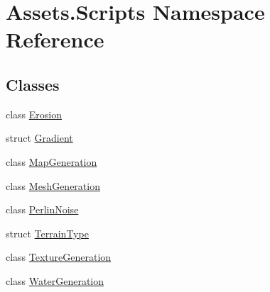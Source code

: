 \hypertarget{namespace_assets_1_1_scripts}{}\section{Assets.\+Scripts Namespace Reference}
\label{namespace_assets_1_1_scripts}
\subsection*{Classes}
\begin{DoxyCompactItemize}
\item 
class \mbox{\hyperlink{class_assets_1_1_scripts_1_1_erosion}{Erosion}}
\item 
struct \mbox{\hyperlink{struct_assets_1_1_scripts_1_1_gradient}{Gradient}}
\item 
class \mbox{\hyperlink{class_assets_1_1_scripts_1_1_map_generation}{Map\+Generation}}
\item 
class \mbox{\hyperlink{class_assets_1_1_scripts_1_1_mesh_generation}{Mesh\+Generation}}
\item 
class \mbox{\hyperlink{class_assets_1_1_scripts_1_1_perlin_noise}{Perlin\+Noise}}
\item 
struct \mbox{\hyperlink{struct_assets_1_1_scripts_1_1_terrain_type}{Terrain\+Type}}
\item 
class \mbox{\hyperlink{class_assets_1_1_scripts_1_1_texture_generation}{Texture\+Generation}}
\item 
class \mbox{\hyperlink{class_assets_1_1_scripts_1_1_water_generation}{Water\+Generation}}
\end{DoxyCompactItemize}
